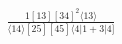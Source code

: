 \documentclass[varwidth, border=5pt]{standalone}
\begin{document}
\begin{my}
$\begin{gathered}
\scriptscriptstyle\frac{1[13][34]^2⟨13⟩}{⟨14⟩[25][45]⟨4|1+3|4]}
\end{gathered}$
\end{my}
\end{document}
